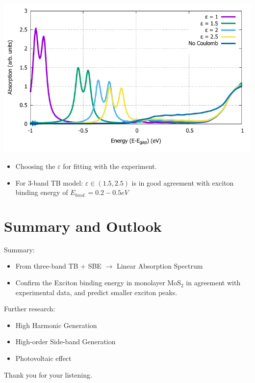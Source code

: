 \documentclass{beamer}
\begin{document}
\begin{frame}
	\begin{center}		
		\includegraphics[width=0.8\linewidth]{images/varyepsilon.pdf}
	\end{center}
	\begin{itemize}
		\item Choosing the $\varepsilon$ for fitting with the experiment.
		\item For 3-band TB model: $\varepsilon \in (1.5,2.5)$ is in good agreement with exciton binding energy of $E_{bind.}= 0.2-0.5 eV$ 
	\end{itemize}
\end{frame}
	\section{Summary and Outlook}
	\begin{frame}
	\begin{block}{Summary:}
\begin{itemize}
\item From three-band TB + SBE $\to $ Linear Absorption Spectrum
\item Confirm the Exciton binding energy in monolayer $\mathrm{MoS}_2$ in agreement with experimental data, and predict smaller exciton peaks.
\end{itemize}
	\end{block}
	\begin{exampleblock}{Further research:}
	\begin{itemize}
		\item High Harmonic Generation
		\item High-order Side-band Generation
		\item Photovoltaic effect
	\end{itemize}
\end{exampleblock}
	\begin{center}
		Thank you for your listening.
	\end{center}
	\end{frame}
	
\end{document}
